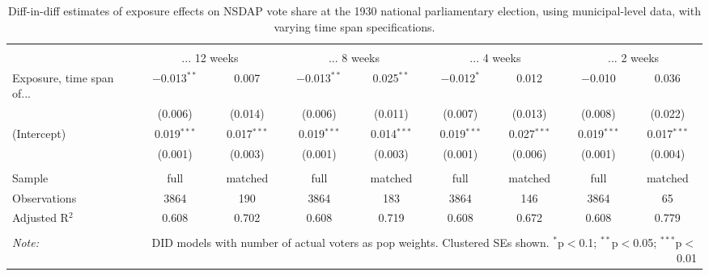
\begin{table}[!htbp] \centering 
  \caption{Diff-in-diff estimates of exposure effects on NSDAP vote share at the 1930 national parliamentary election, using municipal-level data, with varying time span specifications.\vspace{-.25cm}} 
  \label{tab:nsdap-voteshare-timespan-dd-1930comm} 
\scriptsize 
\begin{tabular}{@{\extracolsep{5pt}}lcccccccc} 
\\[-1.8ex]\hline 
\hline \\[-1.8ex] 
 & \multicolumn{2}{c}{... 12 weeks} & \multicolumn{2}{c}{... 8 weeks} & \multicolumn{2}{c}{... 4 weeks} & \multicolumn{2}{c}{... 2 weeks} \\ 
 \cmidrule(r){2-3}\cmidrule(r){4-5}\cmidrule(r){6-7}\cmidrule(r){8-9}Exposure, time span of... & $-$0.013$^{**}$ & 0.007 & $-$0.013$^{**}$ & 0.025$^{**}$ & $-$0.012$^{*}$ & 0.012 & $-$0.010 & 0.036 \\ 
  & (0.006) & (0.014) & (0.006) & (0.011) & (0.007) & (0.013) & (0.008) & (0.022) \\ 
  (Intercept) & 0.019$^{***}$ & 0.017$^{***}$ & 0.019$^{***}$ & 0.014$^{***}$ & 0.019$^{***}$ & 0.027$^{***}$ & 0.019$^{***}$ & 0.017$^{***}$ \\ 
  & (0.001) & (0.003) & (0.001) & (0.003) & (0.001) & (0.006) & (0.001) & (0.004) \\ 
 \hline \\[-1.8ex] 
Sample & full & matched & full & matched & full & matched & full & matched \\ 
Observations & 3864 & 190 & 3864 & 183 & 3864 & 146 & 3864 & 65 \\ 
Adjusted R$^{2}$ & 0.608 & 0.702 & 0.608 & 0.719 & 0.608 & 0.672 & 0.608 & 0.779 \\ 
\hline 
\hline \\[-1.8ex] 
\textit{Note:}  & \multicolumn{8}{r}{DID models with number of actual voters as pop weights. Clustered SEs shown. $^{*}$p$<$0.1; $^{**}$p$<$0.05; $^{***}$p$<$0.01} \\ 
\end{tabular} 
\end{table} 
